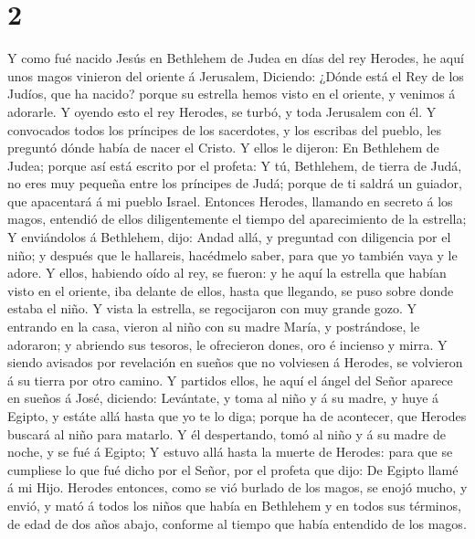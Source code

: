 \hypertarget{section-1}{%
\section{2}\label{section-1}}

 Y como fué nacido Jesús en Bethlehem de Judea en días del
rey Herodes, he aquí unos magos vinieron del oriente á Jerusalem,
 Diciendo: ¿Dónde está el Rey de los Judíos, que ha nacido?
porque su estrella hemos visto en el oriente, y venimos á adorarle.
 Y oyendo esto el rey Herodes, se turbó, y toda Jerusalem
con él.  Y convocados todos los príncipes de los sacerdotes,
y los escribas del pueblo, les preguntó dónde había de nacer el Cristo.
 Y ellos le dijeron: En Bethlehem de Judea; porque así está
escrito por el profeta:  Y tú, Bethlehem, de tierra de Judá,
no eres muy pequeña entre los príncipes de Judá; porque de ti saldrá un
guiador, que apacentará á mi pueblo Israel.  Entonces
Herodes, llamando en secreto á los magos, entendió de ellos
diligentemente el tiempo del aparecimiento de la estrella; 
Y enviándolos á Bethlehem, dijo: Andad allá, y preguntad con diligencia
por el niño; y después que le hallareis, hacédmelo saber, para que yo
también vaya y le adore.  Y ellos, habiendo oído al rey, se
fueron: y he aquí la estrella que habían visto en el oriente, iba
delante de ellos, hasta que llegando, se puso sobre donde estaba el
niño.  Y vista la estrella, se regocijaron con muy grande
gozo.  Y entrando en la casa, vieron al niño con su madre
María, y postrándose, le adoraron; y abriendo sus tesoros, le ofrecieron
dones, oro é incienso y mirra.  Y siendo avisados por
revelación en sueños que no volviesen á Herodes, se volvieron á su
tierra por otro camino.  Y partidos ellos, he aquí el ángel
del Señor aparece en sueños á José, diciendo: Levántate, y toma al niño
y á su madre, y huye á Egipto, y estáte allá hasta que yo te lo diga;
porque ha de acontecer, que Herodes buscará al niño para matarlo.
 Y él despertando, tomó al niño y á su madre de noche, y se
fué á Egipto;  Y estuvo allá hasta la muerte de Herodes:
para que se cumpliese lo que fué dicho por el Señor, por el profeta que
dijo: De Egipto llamé á mi Hijo.  Herodes entonces, como se
vió burlado de los magos, se enojó mucho, y envió, y mató á todos los
niños que había en Bethlehem y en todos sus términos, de edad de dos
años abajo, conforme al tiempo que había entendido de los magos.
